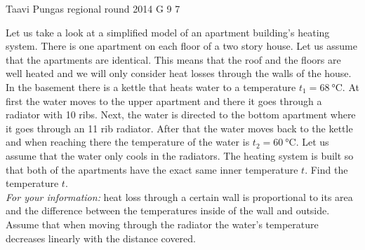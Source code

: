 \documentclass[11pt]{article}
\begin{document}
{Taavi Pungas} %
{regional round} %
{2014} %
{G 9} %
{7} %
{

\ifEngStatement
Let us take a look at a simplified model of an apartment building’s heating system. There is one apartment on each floor of a two story house. Let us assume that the apartments are identical. This means that the roof and the floors are well heated and we will only consider heat losses through the walls of the house.\\
In the basement there is a kettle that heats water to a temperature $t_1=\SI{68}{\celsius}$. At first the water moves to the upper apartment and there it goes through a radiator with 10 ribs. Next, the water is directed to the bottom apartment where it goes through an 11 rib radiator. After that the water moves back to the kettle and when reaching there the temperature of the water is $t_2=\SI{60}{\celsius}$. Let us assume that the water only cools in the radiators. The heating system is built so that both of the apartments have the exact same inner temperature $t$. Find the temperature $t$. \\
\emph{For your information:} heat loss through a certain wall is proportional to its area and the difference between the temperatures inside of the wall and outside. Assume that when moving through the radiator the water’s temperature decreases linearly with the distance covered.
\fi
}
\end{document}
